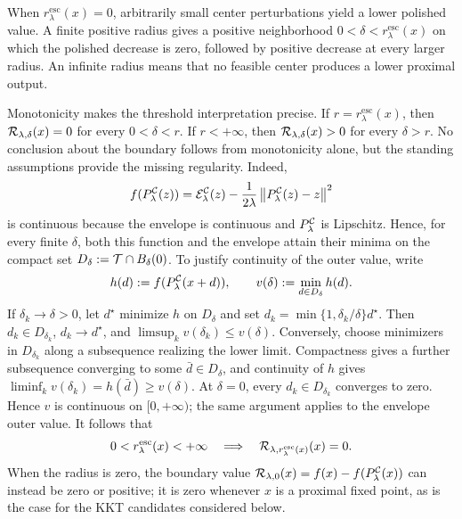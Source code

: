 When \(r_{\lambda}^{\mathrm{esc}}(x)=0\), arbitrarily small center
perturbations yield a lower polished value.  A finite positive radius gives a
positive neighborhood \(0<\delta<r_{\lambda}^{\mathrm{esc}}(x)\) on which the
polished decrease is zero, followed by positive decrease at every larger
radius.  An infinite radius means that no feasible center produces a lower
proximal output.

Monotonicity makes the threshold interpretation precise.  If
\(r=r_{\lambda}^{\mathrm{esc}}(x)\), then
\(\mathcal{R}_{\lambda,\delta}(x)=0\) for every \(0<\delta<r\).  If \(r<+\infty\),
then \(\mathcal{R}_{\lambda,\delta}(x)>0\) for every \(\delta>r\).  No conclusion
about the boundary follows from monotonicity alone, but the standing
assumptions provide the missing regularity.  Indeed,
\[
  f(P_\lambda^{\mathcal{C}}(z))
  =
  \mathcal{E}_\lambda^{\mathcal{C}}(z)
  -\frac{1}{2\lambda}\left\lVert P_\lambda^{\mathcal{C}}(z)-z\right\rVert^{2}
\]
is continuous because the envelope is continuous and
\(P_\lambda^{\mathcal{C}}\) is Lipschitz.  Hence, for every finite \(\delta\), both
this function and the envelope attain their minima on the compact set
\(D_\delta:=\mathcal{T}\cap B_\delta(0)\).  To justify continuity of the outer
value, write
\[
  h(d):=f(P_\lambda^{\mathcal{C}}(x+d)),
  \qquad
  v(\delta):=\min_{d\in D_\delta}h(d).
\]
If \(\delta_k\to\delta>0\), let \(d^\star\) minimize \(h\) on
\(D_\delta\) and set
\(d_k=\min\{1,\delta_k/\delta\}d^\star\).  Then
\(d_k\in D_{\delta_k}\), \(d_k\to d^\star\), and
\(\limsup_kv(\delta_k)\le v(\delta)\).  Conversely, choose minimizers in
\(D_{\delta_k}\) along a subsequence realizing the lower limit.  Compactness
gives a further subsequence converging to some \(\bar d\in D_\delta\), and
continuity of \(h\) gives
\(\liminf_kv(\delta_k)=h(\bar d)\ge v(\delta)\).  At \(\delta=0\), every
\(d_k\in D_{\delta_k}\) converges to zero.  Hence \(v\) is continuous on
\([0,+\infty)\); the same argument applies to the envelope outer value.
It follows that
\[
  0<r_{\lambda}^{\mathrm{esc}}(x)<+\infty
  \quad\Longrightarrow\quad
  \mathcal{R}_{\lambda,r_{\lambda}^{\mathrm{esc}}(x)}(x)=0.
\]
When the radius is zero, the boundary value
\(\mathcal{R}_{\lambda,0}(x)=f(x)-f(P_\lambda^{\mathcal{C}}(x))\) can instead be zero or
positive; it is zero whenever \(x\) is a proximal fixed point, as is the case
for the KKT candidates considered below.

